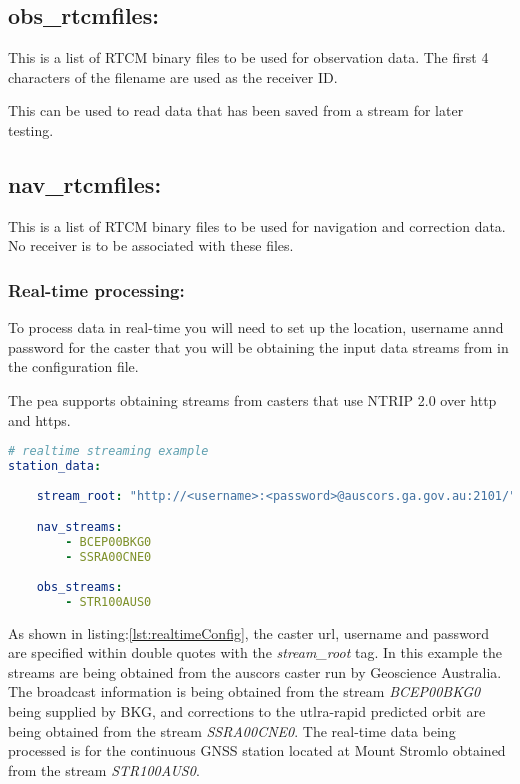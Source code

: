\subsection*{obs\_rtcmfiles:}
This is a list of RTCM binary files to be used for observation data. The first 4 characters of the filename are used as the receiver ID.

This can be used to read data that has been saved from a stream for later testing.

\subsection*{nav\_rtcmfiles:}
This is a list of RTCM binary files to be used for navigation and correction data. No receiver is to be associated with these files.

\subsubsection{Real-time processing:}

To process data in real-time you will need to set up the location, username annd password for the caster that you will be obtaining the input data streams from in the configuration file.

The pea supports obtaining streams from casters that use NTRIP 2.0 over http and https.


\begin{lstlisting}[language=yaml,caption=station\_data:]
# realtime streaming example
station_data:
	
	stream_root: "http://<username>:<password>@auscors.ga.gov.au:2101/"

	nav_streams:
		- BCEP00BKG0
		- SSRA00CNE0
		
	obs_streams:
		- STR100AUS0
\end{lstlisting} \label{lst:realtimeConfig}

As shown in listing:\ref{lst:realtimeConfig}, the caster url, username and password are specified within double quotes with the \emph{stream\_root} tag. In this example the streams are being obtained from the auscors caster run by Geoscience Australia. 
The broadcast information is being obtained from the stream \emph{BCEP00BKG0} being supplied by BKG, and corrections to the utlra-rapid predicted orbit are being obtained from the stream \emph{SSRA00CNE0}. 
The real-time data being processed is for the continuous GNSS station located at Mount Stromlo obtained from the stream \emph{STR100AUS0}.

